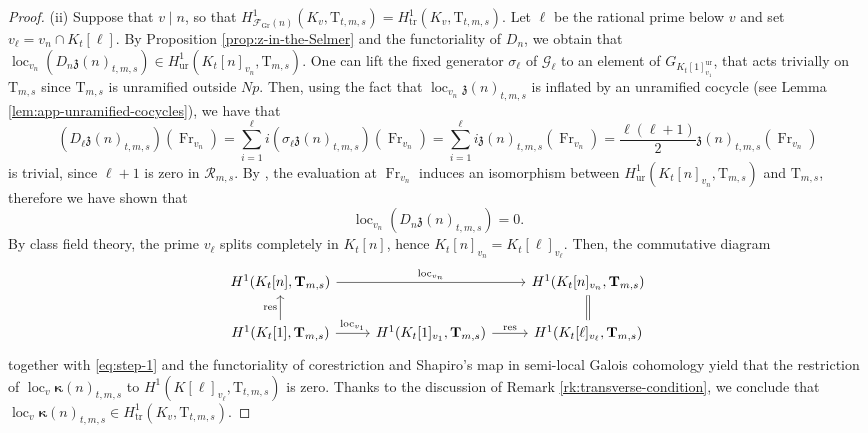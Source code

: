 \documentclass[12pt,reqno]{amsart}
\theoremstyle{definition}
\theoremstyle{remark}
\newcommand{\T}{\boldsymbol{\mathrm{T}}}
\newcommand{\calR}{\mathcal{R}}
\DeclareMathOperator{\res}{res}
\DeclareMathOperator{\loc}{loc}
\DeclareMathOperator{\Fr}{Fr}
\newcommand{\tr}{\mathrm{tr}}
\newcommand{\Gr}{\mathrm{Gr}}
\newcommand{\ur}{\mathrm{ur}}
\begin{document}
\begin{proof}
    (ii) Suppose that $v\mid n$, so that $H^1_{\mathcal{F}_{\Gr}(n)}(K_v,\T_{t,m,s})=H^1_{\tr}(K_v,\T_{t,m,s})$. Let $\ell$ be the rational prime below $v$ and set $v_\ell=v_n\cap K_t[\ell]$. By Proposition \ref{prop:z-in-the-Selmer} and the functoriality of $D_n$, we obtain that $\loc_{v_n}(D_n\mathfrak{z}(n)_{t,m,s})\in H^1_{\ur}(K_t[n]_{v_n},\T_{m,s})$. One can lift the fixed generator $\sigma_\ell$ of $\mathcal{G}_\ell$ to an element of $G_{K_t[1]_{v_1}^{\ur}}$, that acts trivially on $\T_{m,s}$ since $\T_{m,s}$ is unramified outside $Np$. Then, using the fact that $\loc_{v_n}\mathfrak{z}(n)_{t,m,s}$ is inflated by an unramified cocycle (see Lemma \ref{lem:app-unramified-cocycles}), we have that
    \begin{equation*}
       (D_\ell \mathfrak{z}(n)_{t,m,s})(\Fr_{v_n})=\sum_{i=1}^\ell i(\sigma_\ell \mathfrak{z}(n)_{t,m,s})(\Fr_{v_n})=\sum_{i=1}^\ell i \mathfrak{z}(n)_{t,m,s}(\Fr_{v_n})=\frac{\ell(\ell+1)}{2} \mathfrak{z}(n)_{t,m,s}(\Fr_{v_n})
   \end{equation*}
     is trivial, since $\ell+1$ is zero in $\calR_{m,s}$. By \cite[Lemma 1.2.1]{Mazur-Rubin:Kolyvagin-systems}, the evaluation at $\Fr_{v_n}$ induces an isomorphism between $H^1_{\ur}(K_t[n]_{v_n},\T_{m,s})$ and $\T_{m,s}$, therefore we have shown that
    \begin{equation}\label{eq:step-1}
        \loc_{v_n}(D_n\mathfrak{z}(n)_{t,m,s})=0.
    \end{equation}
    By class field theory, the prime $v_\ell$ splits completely in $K_t[n]$, hence $K_t[n]_{v_n}=K_t[\ell]_{v_\ell}$. Then, the commutative diagram
\begin{equation*}
		\begin{tikzcd}
		{H^1(K_t[n],\T_{m,s})} && {H^1(K_t[n]_{v_n},\T_{m,s})} \\
		{H^1(K_t[1],\T_{m,s})} & {H^1(K_t[1]_{v_1},\T_{m,s})} & {H^1(K_t[\ell]_{v_\ell},\T_{m,s})}
		\arrow["{\loc_{v_n}}", from=1-1, to=1-3]
		\arrow["\res", from=2-1, to=1-1]
		\arrow["{\loc_{v_1}}", from=2-1, to=2-2]
		\arrow["\res", from=2-2, to=2-3]
		\arrow[Rightarrow, no head, from=2-3, to=1-3]
		\end{tikzcd}
		\end{equation*}
together with \eqref{eq:step-1} and the functoriality of corestriction and Shapiro's map in semi-local Galois cohomology yield that the restriction of $\loc_v\boldsymbol{\kappa}(n)_{t,m,s}$ to $H^1(K[\ell]_{v_\ell},\T_{t,m,s})$ is zero. Thanks to the discussion of Remark \ref{rk:transverse-condition}, we conclude that $\loc_v\boldsymbol{\kappa}(n)_{t,m,s}\in H^1_{\tr}(K_v,\T_{t,m,s})$.


\end{proof}
\end{document}

